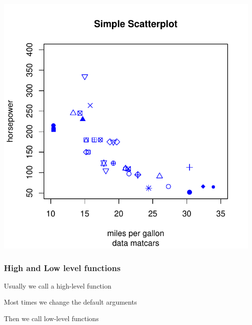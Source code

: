 \documentclass[12pt]{beamer}\usepackage[]{graphicx}\usepackage[]{color}
\newenvironment{knitrout}{}{} %
\begin{document}

\begin{frame}[fragile]
\begin{knitrout}\footnotesize
{}\color{fgcolor}

{\centering \includegraphics[width=.8\linewidth,height=.8\linewidth]{figure/plot_mtcars-1} 

}



\end{knitrout}
\end{frame}


\begin{frame}
\begin{center}
\Huge{}
\end{center}
\end{frame}


\begin{frame}
\frametitle{High and Low level functions}

\bi
  \item Usually we call a high-level function
  \item Most times we change the default arguments
  \item Then we call low-level functions
\ei

\end{frame}
\end{document}
